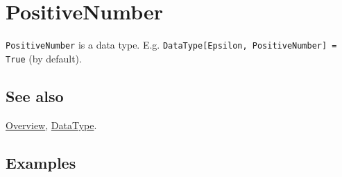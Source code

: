 \documentclass[../FeynCalcManual.tex]{subfiles}
\begin{document}
\hypertarget{positivenumber}{%
\section{PositiveNumber}\label{positivenumber}}

\texttt{PositiveNumber} is a data type. E.g.
\texttt{DataType[\allowbreak{}Epsilon,\ \allowbreak{}PositiveNumber] = True}
(by default).

\subsection{See also}

\hyperlink{toc}{Overview}, \hyperlink{datatype}{DataType}.

\subsection{Examples}
\end{document}

